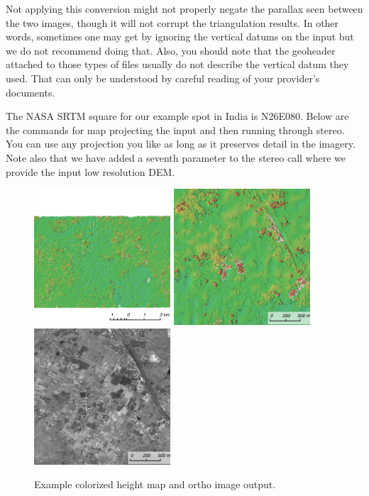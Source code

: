 Not applying this conversion might not properly negate the parallax
seen between the two images, though it will not corrupt the
triangulation results. In other words, sometimes one may get by
ignoring the vertical datums on the input but we do not recommend
doing that. Also, you should note that the geoheader attached to those
types of files usually do not describe the vertical datum they
used. That can only be understood by careful reading of your
provider's documents.

The NASA SRTM square for our example spot in India is N26E080. Below
are the commands for map projecting the input and then running
through stereo. You can use any projection you like as long as it
preserves detail in the imagery. Note also that we have added a
seventh parameter to the stereo call where we provide the input low
resolution DEM.

\begin{figure}[h!]
\centering
  \includegraphics[width=2.0in]{images/examples/dg/MappedContext.png}
  \includegraphics[width=2.0in]{images/examples/dg/MappedCloseUp.png}
  \includegraphics[width=2.0in]{images/examples/dg/MappedCloseUpDRG.png}
\caption{Example colorized height map and ortho image output.}
\label{fig:dg-map-example}
\end{figure}

